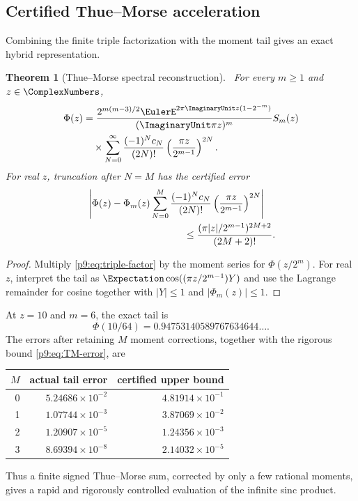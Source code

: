 \documentclass[11pt]{article}
\numberwithin{equation}{section}
\newtheorem{theorem}{Theorem}[section]
\theoremstyle{definition}
\theoremstyle{remark}
\begin{document}
\subsection{Certified Thue--Morse acceleration}
Combining the finite triple factorization with the moment tail gives an exact hybrid
representation.

\begin{theorem}[Thue--Morse spectral reconstruction]\label{p9:thm:TM-reconstruction}
\statusN\ For every $m\ge1$ and $z\in\ComplexNumbers$,
\begin{align}
 \Phi(z)
 &=\frac{2^{m(m-3)/2}\EulerE^{2\pi\ImaginaryUnit z(1-2^{-m})}}{(\ImaginaryUnit\pi z)^m}
 S_m(z)                                                     \notag\\
 &\quad\times
 \sum_{N=0}^{\infty}\frac{(-1)^Nc_N}{(2N)!}
 \left(\frac{\pi z}{2^{m-1}}\right)^{2N}.                 \label{p9:eq:TM-reconstruction}
\end{align}
For real $z$, truncation after $N=M$ has the certified error
\begin{align}
 &\left|\Phi(z)-\Phi_m(z)
 \sum_{N=0}^{M}\frac{(-1)^Nc_N}{(2N)!}
 \left(\frac{\pi z}{2^{m-1}}\right)^{2N}\right|           \notag\\
 &\hspace{35mm}\le
 \frac{(\pi|z|/2^{m-1})^{2M+2}}{(2M+2)!}.                 \label{p9:eq:TM-error}
\end{align}
\end{theorem}

\begin{proof}
Multiply \eqref{p9:eq:triple-factor} by the moment series for
$\Phi(z/2^m)$.  For real $z$, interpret the tail as
$\Expectation\cos((\pi z/2^{m-1})Y)$ and use the Lagrange remainder for cosine together with
$|Y|\le1$ and $|\Phi_m(z)|\le1$.
\end{proof}

\begin{example}
At $z=10$ and $m=6$, the exact tail is
\[
\Phi(10/64)=0.94753140589767634644\ldots.
\]
The errors after retaining $M$ moment
corrections, together with the rigorous bound \eqref{p9:eq:TM-error}, are
\begin{center}
\begin{tabular}{@{}rrr@{}}
\toprule
$M$ & actual tail error & certified upper bound\\
\midrule
0 & $5.24686\times10^{-2}$ & $4.81914\times10^{-1}$\\
1 & $1.07744\times10^{-3}$ & $3.87069\times10^{-2}$\\
2 & $1.20907\times10^{-5}$ & $1.24356\times10^{-3}$\\
3 & $8.69394\times10^{-8}$ & $2.14032\times10^{-5}$\\
\bottomrule
\end{tabular}
\end{center}
Thus a finite signed Thue--Morse sum, corrected by only a few rational moments, gives a
rapid and rigorously controlled evaluation of the infinite sinc product.
\end{example}
\end{document}

